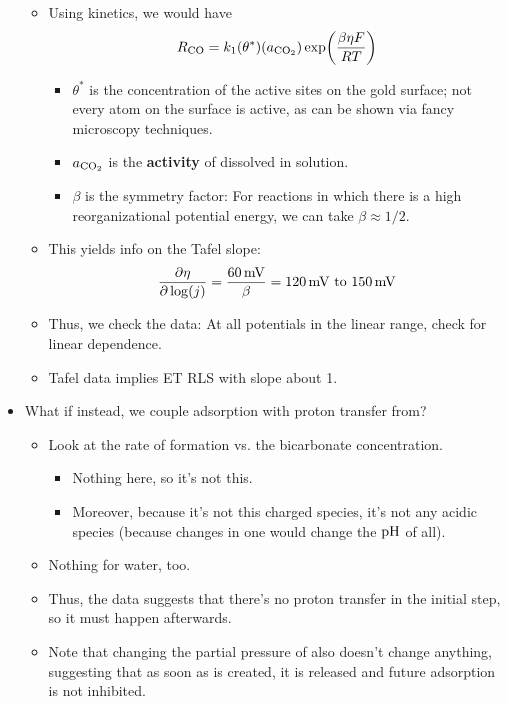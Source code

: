 \documentclass[../notes.tex]{subfiles}
\begin{document}
\begin{itemize}
\begin{itemize}
        \item Using kinetics, we would have
        \begin{equation*}
            R_{\ce{CO}} = k_1(\theta^*)(a_{\ce{CO2}})\exp(\frac{\beta\eta F}{RT})
        \end{equation*}
        \begin{itemize}
            \item $\theta^*$ is the concentration of the active sites on the gold surface; not every atom on the surface is active, as can be shown via fancy microscopy techniques.
            \item $a_{\ce{CO2}}$ is the \textbf{activity} of  dissolved in solution.
            \item $\beta$ is the symmetry factor: For reactions in which there is a high reorganizational potential energy, we can take $\beta\approx 1/2$.
        \end{itemize}
        \item This yields info on the Tafel slope:
        \begin{equation*}
            \pdv{\eta}{\log(j)} = \frac{\SI{60}{\milli\volt}}{\beta}
            = \SIrange{120}{150}{\milli\volt}
        \end{equation*}
        \item Thus, we check the data: At all potentials in the linear range, check for linear dependence.
        \item Tafel data implies ET RLS with slope about 1.
    \end{itemize}
    \item What if instead, we couple adsorption with proton transfer from?
    \begin{itemize}
        \item Look at the rate of  formation vs. the bicarbonate concentration.
        \begin{itemize}
            \item Nothing here, so it's not this.
            \item Moreover, because it's not this charged species, it's not any acidic species (because changes in one would change the $\operatorname{pH}$ of all).
        \end{itemize}
        \item Nothing for water, too.
        \item Thus, the data suggests that there's no proton transfer in the initial step, so it must happen afterwards.
        \item Note that changing the partial pressure of  also doesn't change anything, suggesting that as soon as  is created, it is released and future adsorption is not inhibited.

\end{itemize}
\end{itemize}
\end{document}
